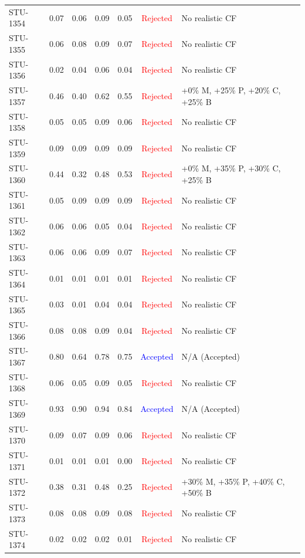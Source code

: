 \begin{longtable}{l c c c c | c | l}
STU-1354 & 0.07 & 0.06 & 0.09 & 0.05 & \textcolor{red}{Rejected} & No realistic CF \\
STU-1355 & 0.06 & 0.08 & 0.09 & 0.07 & \textcolor{red}{Rejected} & No realistic CF \\
STU-1356 & 0.02 & 0.04 & 0.06 & 0.04 & \textcolor{red}{Rejected} & No realistic CF \\
STU-1357 & 0.46 & 0.40 & 0.62 & 0.55 & \textcolor{red}{Rejected} & +0\% M, +25\% P, +20\% C, +25\% B \\
STU-1358 & 0.05 & 0.05 & 0.09 & 0.06 & \textcolor{red}{Rejected} & No realistic CF \\
STU-1359 & 0.09 & 0.09 & 0.09 & 0.09 & \textcolor{red}{Rejected} & No realistic CF \\
STU-1360 & 0.44 & 0.32 & 0.48 & 0.53 & \textcolor{red}{Rejected} & +0\% M, +35\% P, +30\% C, +25\% B \\
STU-1361 & 0.05 & 0.09 & 0.09 & 0.09 & \textcolor{red}{Rejected} & No realistic CF \\
STU-1362 & 0.06 & 0.06 & 0.05 & 0.04 & \textcolor{red}{Rejected} & No realistic CF \\
STU-1363 & 0.06 & 0.06 & 0.09 & 0.07 & \textcolor{red}{Rejected} & No realistic CF \\
STU-1364 & 0.01 & 0.01 & 0.01 & 0.01 & \textcolor{red}{Rejected} & No realistic CF \\
STU-1365 & 0.03 & 0.01 & 0.04 & 0.04 & \textcolor{red}{Rejected} & No realistic CF \\
STU-1366 & 0.08 & 0.08 & 0.09 & 0.04 & \textcolor{red}{Rejected} & No realistic CF \\
STU-1367 & 0.80 & 0.64 & 0.78 & 0.75 & \textcolor{blue}{Accepted} & N/A (Accepted) \\
STU-1368 & 0.06 & 0.05 & 0.09 & 0.05 & \textcolor{red}{Rejected} & No realistic CF \\
STU-1369 & 0.93 & 0.90 & 0.94 & 0.84 & \textcolor{blue}{Accepted} & N/A (Accepted) \\
STU-1370 & 0.09 & 0.07 & 0.09 & 0.06 & \textcolor{red}{Rejected} & No realistic CF \\
STU-1371 & 0.01 & 0.01 & 0.01 & 0.00 & \textcolor{red}{Rejected} & No realistic CF \\
STU-1372 & 0.38 & 0.31 & 0.48 & 0.25 & \textcolor{red}{Rejected} & +30\% M, +35\% P, +40\% C, +50\% B \\
STU-1373 & 0.08 & 0.08 & 0.09 & 0.08 & \textcolor{red}{Rejected} & No realistic CF \\
STU-1374 & 0.02 & 0.02 & 0.02 & 0.01 & \textcolor{red}{Rejected} & No realistic CF \\

\end{longtable}
